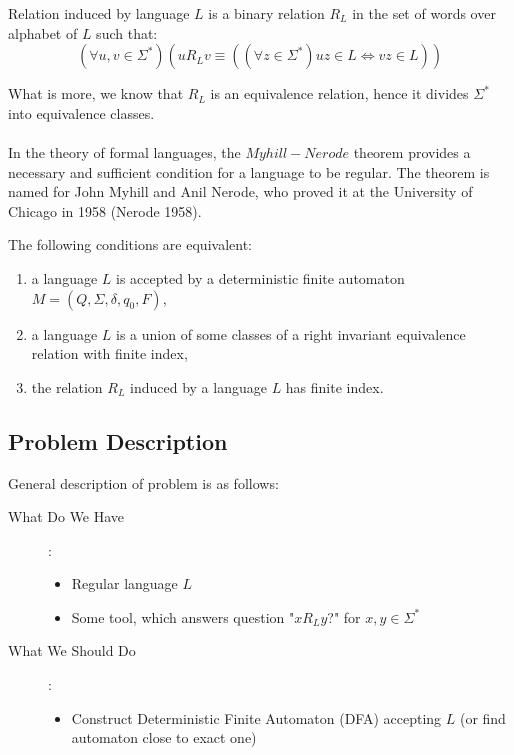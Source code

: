 \documentclass[runningheads,a4paper]{llncs}
\begin{document}
\begin{definition}
Relation induced by language $L$ is a binary relation $R_{L}$ in the set of words over alphabet of $L$ such that:
\[
(\forall{u,v \in \Sigma^{*}})(u R_{L} v \equiv ((\forall z \in \Sigma^{*}) uz \in L \Leftrightarrow vz \in L))
\]
\end{definition}
What is more, we know that $R_{L}$ is an equivalence relation, hence it divides $\Sigma^{*}$ into equivalence classes.

\paragraph{}
In the theory of formal languages, the $Myhill-Nerode$ theorem provides a necessary and sufficient condition for a language to be regular. The theorem is named for John Myhill and Anil Nerode, who proved it at the University of Chicago in 1958 (Nerode 1958).

\begin{theorem}\label{Theorem:Myhill_Nerode}
The following conditions are equivalent:
\begin{enumerate}
\item a language $L$ is accepted by a deterministic finite automaton $M = (Q,\Sigma,\delta,q_0,F)$,
\item a language $L$ is a union of some classes of a right invariant equivalence relation with finite index,
\item the relation $R_{L}$ induced by a language $L$ has finite index.
\end{enumerate}
\end{theorem}

\subsection{Problem Description}
General description of problem is as follows:

\begin{description}
  \item[What Do We Have]: 
   	\begin{itemize}
		\item Regular language $L$
		\item Some tool, which answers question "$x R_{L} y$?" for $x,y \in \Sigma^{*}$
	\end{itemize}
  \item[What We Should Do]:
    \begin{itemize}
		\item Construct Deterministic Finite Automaton (DFA) accepting $L$ (or find automaton close to exact one)
	\end{itemize}
 \end{description}
\end{document}
